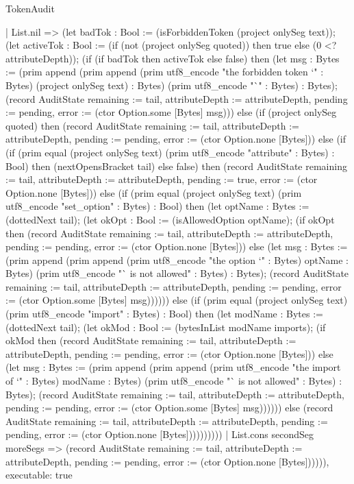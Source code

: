 \begin{lexlean}{TokenAudit}
\begin{semanticmodule}
{        | List.nil => (let badTok : Bool := (isForbiddenToken (project onlySeg text)); (let activeTok : Bool := (if (not (project onlySeg quoted)) then true else (0 <? attributeDepth)); (if (if badTok then activeTok else false) then (let msg : Bytes := (prim append (prim append (prim utf8_encode "the forbidden token `" : Bytes) (project onlySeg text) : Bytes) (prim utf8_encode "`" : Bytes) : Bytes); (record AuditState {remaining := tail, attributeDepth := attributeDepth, pending := pending, error := (ctor Option.some [Bytes] msg)})) else (if (project onlySeg quoted) then (record AuditState {remaining := tail, attributeDepth := attributeDepth, pending := pending, error := (ctor Option.none [Bytes])}) else (if (if (prim equal (project onlySeg text) (prim utf8_encode "attribute" : Bytes) : Bool) then (nextOpensBracket tail) else false) then (record AuditState {remaining := tail, attributeDepth := attributeDepth, pending := true, error := (ctor Option.none [Bytes])}) else (if (prim equal (project onlySeg text) (prim utf8_encode "set_option" : Bytes) : Bool) then (let optName : Bytes := (dottedNext tail); (let okOpt : Bool := (isAllowedOption optName); (if okOpt then (record AuditState {remaining := tail, attributeDepth := attributeDepth, pending := pending, error := (ctor Option.none [Bytes])}) else (let msg : Bytes := (prim append (prim append (prim utf8_encode "the option `" : Bytes) optName : Bytes) (prim utf8_encode "` is not allowed" : Bytes) : Bytes); (record AuditState {remaining := tail, attributeDepth := attributeDepth, pending := pending, error := (ctor Option.some [Bytes] msg)}))))) else (if (prim equal (project onlySeg text) (prim utf8_encode "import" : Bytes) : Bool) then (let modName : Bytes := (dottedNext tail); (let okMod : Bool := (bytesInList modName imports); (if okMod then (record AuditState {remaining := tail, attributeDepth := attributeDepth, pending := pending, error := (ctor Option.none [Bytes])}) else (let msg : Bytes := (prim append (prim append (prim utf8_encode "the import of `" : Bytes) modName : Bytes) (prim utf8_encode "` is not allowed" : Bytes) : Bytes); (record AuditState {remaining := tail, attributeDepth := attributeDepth, pending := pending, error := (ctor Option.some [Bytes] msg)}))))) else (record AuditState {remaining := tail, attributeDepth := attributeDepth, pending := pending, error := (ctor Option.none [Bytes])}))))))))
        | List.cons secondSeg moreSegs => (record AuditState {remaining := tail, attributeDepth := attributeDepth, pending := pending, error := (ctor Option.none [Bytes])})))),
  executable: true
}


\end{semanticmodule}
\end{lexlean}
